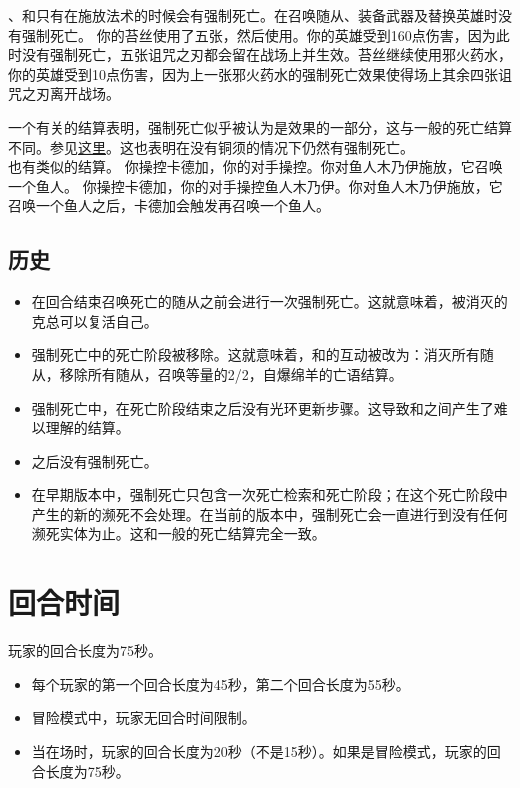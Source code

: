 \notice {}、和只有在施放法术的时候会有强制死亡。在召唤随从、装备武器及替换英雄时没有强制死亡。
\example 你的苔丝使用了五张，然后使用。你的英雄受到160点伤害，因为此时没有强制死亡，五张诅咒之刃都会留在战场上并生效。苔丝继续使用邪火药水，你的英雄受到10点伤害，因为上一张邪火药水的强制死亡效果使得场上其余四张诅咒之刃离开战场。

\notice \version{}{}一个有关的结算表明，强制死亡似乎被认为是效果的一部分，这与一般的死亡结算不同。参见\href{https://www.bilibili.com/video/av64643539}{这里}。这也表明在没有铜须的情况下仍然有强制死亡。\\
也有类似的结算。
\example 你操控卡德加，你的对手操控。你对鱼人木乃伊施放，它召唤一个鱼人。
\example 你操控卡德加，你的对手操控鱼人木乃伊。你对鱼人木乃伊施放，它召唤一个鱼人之后，卡德加会触发再召唤一个鱼人。

\subsection{历史}

\begin{itemize}
    \item {} 在回合结束召唤死亡的随从之前会进行一次强制死亡。这就意味着，被消灭的克总可以复活自己。
    \item {} 强制死亡中的死亡阶段被移除。这就意味着，和的互动被改为：消灭所有随从，移除所有随从，召唤等量的2/2，自爆绵羊的亡语结算。
    \item {} 强制死亡中，在死亡阶段结束之后没有光环更新步骤。这导致和之间产生了难以理解的结算。
    \item {} 之后没有强制死亡。
    \item {} 在早期版本中，强制死亡只包含一次死亡检索和死亡阶段；在这个死亡阶段中产生的新的濒死不会处理。在当前的版本中，强制死亡会一直进行到没有任何濒死实体为止。这和一般的死亡结算完全一致。
\end{itemize}

\section{回合时间}

玩家的回合长度为75秒。
\begin{itemize}
    \item 每个玩家的第一个回合长度为45秒，第二个回合长度为55秒。
    \item 冒险模式中，玩家无回合时间限制。
    \item 当在场时，玩家的回合长度为20秒（不是15秒）。如果是冒险模式，玩家的回合长度为75秒。
\end{itemize}